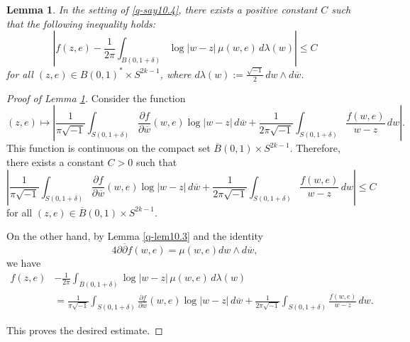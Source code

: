 \documentclass[12pt,twoside]{amsart}
\newtheorem{lem}[thm]{Lemma}
\theoremstyle{definition}
\begin{document}
\begin{lem}\label{q-lem10.5}
In the setting of \ref{q-say10.4},  
there exists a positive constant \( C \) such 
that the following inequality holds:
\[
\left| 
f(z,e) - \frac{1}{2\pi} \int_{B(0,1+\delta)} \log |w - z| \, \mu(w,e) \, d\lambda(w)
\right| \leq C
\]
for all \( (z,e) \in B(0,1)^* \times S^{2k-1} \),  
where \( d\lambda(w) := \frac{\sqrt{-1}}{2} \, dw \wedge d\overline{w} \).
\end{lem}

\begin{proof}[Proof of Lemma \ref{q-lem10.5}]
Consider the function
\[
(z,e) \mapsto
\left|
\frac{1}{\pi \sqrt{-1}} \int_{S(0,1+\delta)}
\frac{\partial f}{\partial \overline{w}}(w, e) \log|w - z| \, d\overline{w}
+
\frac{1}{2\pi \sqrt{-1}} \int_{S(0,1+\delta)} \frac{f(w,e)}{w - z} \, dw
\right|.
\]
This function is continuous on the compact set $\overline{B}(0,1) \times S^{2k-1}$.  
Therefore, there exists a constant $C > 0$ such that
\[
\left|
\frac{1}{\pi \sqrt{-1}} \int_{S(0,1+\delta)}
\frac{\partial f}{\partial \overline{w}}(w, e) \log|w - z| \, d\overline{w}
+
\frac{1}{2\pi \sqrt{-1}} \int_{S(0,1+\delta)} \frac{f(w,e)}{w - z} \, dw
\right| \le C
\]
for all $(z,e) \in \overline{B}(0,1) \times S^{2k-1}$.

On the other hand, by Lemma \ref{q-lem10.3} and the identity
\[
4 \partial \overline{\partial} f(w,e) = \mu(w,e)  dw \wedge d\overline{w},
\]
we have
\begin{align*}
f(z,e) 
&- \frac{1}{2\pi} \int_{B(0,1+\delta)} \log |w - z| \, \mu(w,e) \, d\lambda(w) \\
&=
\frac{1}{\pi \sqrt{-1}} \int_{S(0,1+\delta)}
\frac{\partial f}{\partial \overline{w}}(w,e) \log|w - z| \, d\overline{w}
+
\frac{1}{2\pi \sqrt{-1}} \int_{S(0,1+\delta)} \frac{f(w,e)}{w - z} \, dw.
\end{align*}

This proves the desired estimate.
\end{proof}
\end{document}
